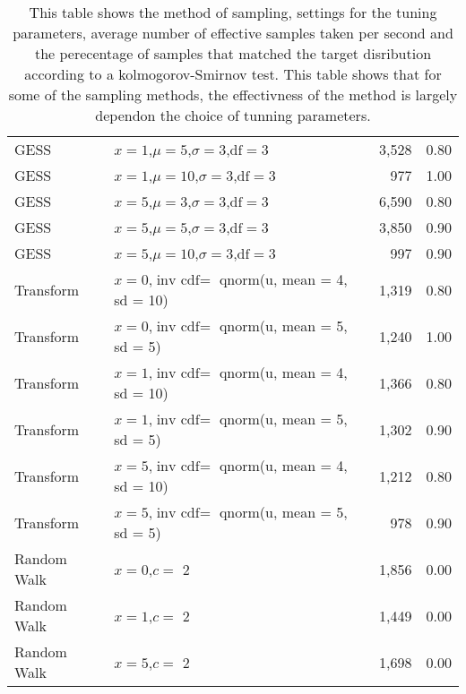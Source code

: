 \begin{table}[h]
\begin{tabular}{llrr}
  GESS & $x = 1  $,$\mu =  5  $,$\sigma =  3  $,$\text{df} =  3 $ & 3,528 & 0.80 \\ 
  GESS & $x = 1  $,$\mu =  10  $,$\sigma =  3  $,$\text{df} =  3 $ & 977 & 1.00 \\ 
  GESS & $x = 5  $,$\mu =  3  $,$\sigma =  3  $,$\text{df} =  3 $ & 6,590 & 0.80 \\ 
  GESS & $x = 5  $,$\mu =  5  $,$\sigma =  3  $,$\text{df} =  3 $ & 3,850 & 0.90 \\ 
  GESS & $x = 5  $,$\mu =  10  $,$\sigma =  3  $,$\text{df} =  3 $ & 997 & 0.90 \\ 
  Transform & $x = 0 $,$\text{inv cdf} =$  qnorm(u, mean = 4, sd = 10) & 1,319 & 0.80 \\ 
  Transform & $x = 0 $,$\text{inv cdf} =$  qnorm(u, mean = 5, sd = 5) & 1,240 & 1.00 \\ 
  Transform & $x = 1 $,$\text{inv cdf} =$  qnorm(u, mean = 4, sd = 10) & 1,366 & 0.80 \\ 
  Transform & $x = 1 $,$\text{inv cdf} =$  qnorm(u, mean = 5, sd = 5) & 1,302 & 0.90 \\ 
  Transform & $x = 5 $,$\text{inv cdf} =$  qnorm(u, mean = 4, sd = 10) & 1,212 & 0.80 \\ 
  Transform & $x = 5 $,$\text{inv cdf} =$  qnorm(u, mean = 5, sd = 5) & 978 & 0.90 \\ 
  Random Walk & $x = 0 $,$c =$  2 & 1,856 & 0.00 \\ 
  Random Walk & $x = 1 $,$c =$  2 & 1,449 & 0.00 \\ 
  Random Walk & $x = 5 $,$c =$  2 & 1,698 & 0.00 \\ 
   \hline
\end{tabular}
\caption{This table shows the method of sampling, settings for the tuning parameters, average number of effective samples taken per second and the perecentage of samples that matched the target disribution according to a kolmogorov-Smirnov test. This table shows that for some of the sampling methods, the effectivness of the method is largely dependon the choice of tunning parameters.} 
\end{table}
